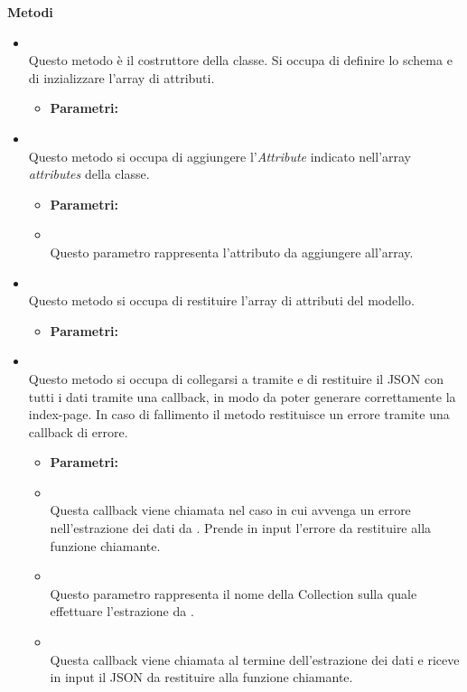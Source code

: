 \textbf{Metodi}
\begin{itemize}
\item[] \textbf{} \\ Questo metodo è il costruttore della classe. Si occupa di definire lo schema e di inzializzare l'array di attributi.
\begin{itemize}\addtolength{\itemsep}{-0.5\baselineskip}
\item[] \textbf{Parametri:}
\end{itemize}
\item[] \textbf{} \\ Questo metodo si occupa di aggiungere l'\textit{Attribute} indicato nell'array \textit{attributes} della classe.
\begin{itemize}\addtolength{\itemsep}{-0.5\baselineskip}
\item[] \textbf{Parametri:}
\item[]  \\ Questo parametro rappresenta l'attributo da aggiungere all'array.
\end{itemize}
\item[] \textbf{} \\ Questo metodo si occupa di restituire l'array di attributi del modello.
\begin{itemize}\addtolength{\itemsep}{-0.5\baselineskip}
\item[] \textbf{Parametri:}
\end{itemize}
\item[] \textbf{} \\ Questo metodo si occupa di collegarsi a  tramite  e di restituire il JSON con tutti i dati tramite una callback, in modo da poter generare correttamente la index-page. In caso di fallimento il metodo restituisce un errore tramite una callback di errore.
\begin{itemize}\addtolength{\itemsep}{-0.5\baselineskip}
\item[] \textbf{Parametri:}
\item[]  \\ Questa callback viene chiamata nel caso in cui avvenga un errore nell'estrazione dei dati da . Prende in input l'errore da restituire alla funzione chiamante.
\item[]  \\ Questo parametro rappresenta il nome della Collection sulla quale effettuare l'estrazione da .
\item[]  \\ Questa callback viene chiamata al termine dell'estrazione dei dati e riceve in input il JSON da restituire alla funzione chiamante.
\end{itemize}
\end{itemize}

